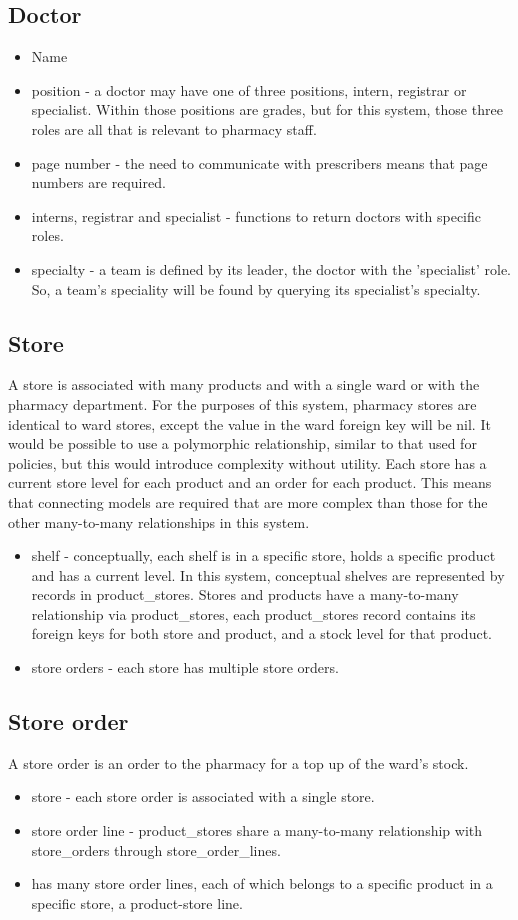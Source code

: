 \documentclass[letterpaper]{amsart}
\begin{document}
\subsection{Doctor}
\begin{itemize}
    \item Name 
    \item position - a doctor may have one of three positions, intern, registrar or specialist.  Within those positions are grades, but for this system, those three roles are all that is relevant to pharmacy staff. 
    \item page number - the need to communicate with prescribers means that page numbers are required. 
    \item interns, registrar and specialist - functions to return doctors with specific roles.
    \item specialty - a team is defined by its leader, the doctor with the 'specialist' role.  So, a team's speciality will be found by querying its specialist's specialty.
\end{itemize}
\subsection{Store}
A store is associated with many products and with a single ward or with the pharmacy department.  For the purposes of this system, pharmacy stores are identical to ward stores, except the value in the ward foreign key will be nil.  It would be possible to use a polymorphic relationship, similar to that used for policies, but this would introduce complexity without utility.  Each store has a current store level for each product and an order for each product.  This means that connecting models are required that are more complex than those for the other many-to-many relationships in this system.
\begin{itemize} 
    \item shelf - conceptually, each shelf is in a specific store, holds a specific product and has a current level.  In this system, conceptual shelves are represented by records in product\_stores.  Stores and products have a many-to-many relationship via product\_stores, each product\_stores record contains its foreign keys for both store and product, and a stock level for that product.
    \item store orders - each store has multiple store orders.
\end{itemize}
\subsection{Store order}
A store order is an order to the pharmacy for a top up of the ward's stock.
\begin{itemize}
    \item store - each store order is associated with a single store.
    \item store order line - product\_stores share a many-to-many relationship with store\_orders through store\_order\_lines.
    \item has many store order lines, each of which belongs to a specific product in a specific store, a product-store line.
\end{itemize}
\end{document}
